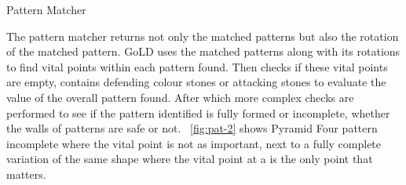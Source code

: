 \documentclass{l4proj}
\begin{document}
\begin{algorithm}[H]
\caption{Pattern Matcher}\label{Pattern Matcher}
    \DontPrintSemicolon
\end{algorithm}

The pattern matcher returns not only the matched patterns but also the rotation of the matched pattern. GoLD uses the matched patterns along with its rotations to find vital points within each pattern found. Then checks if these vital points are empty, contains defending colour stones or attacking stones to evaluate the value of the overall pattern found. After which more complex checks are performed to see if the pattern identified is fully formed or incomplete, whether the walls of patterns are safe or not. ~\autoref{fig:pat-2} shows Pyramid Four pattern incomplete where the vital point is not as important, next to a fully complete variation of the same shape where the vital point at a is the only point that matters.
\end{document}
